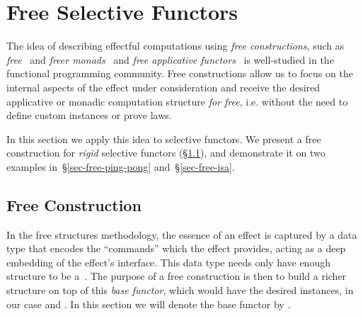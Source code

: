 \section{Free Selective Functors}\label{sec-free}

The idea of describing effectful computations using \emph{free constructions},
such as \emph{free}~\cite{swierstra2008data} and \emph{freer
monads}~\cite{kiselyov2015freer} and \emph{free applicative
functors}~\cite{free-applicatives} is well-studied in the functional programming
community. Free constructions allow us to focus on the internal aspects of the
effect under consideration and receive the desired applicative or monadic
computation structure \emph{for free}, i.e. without the need to define custom
instances or prove laws.

In this section we apply this idea to selective functors. We present a free
construction for \emph{rigid} selective functors
(\S\ref{sec-free-construction}), and demonstrate it on two examples
in~\S\ref{sec-free-ping-pong} and~\S\ref{sec-free-isa}.

\subsection{Free Construction}\label{sec-free-construction}

In the free structures methodology, the essence of an effect is captured by a
data type that encodes the ``commands'' which the effect provides, acting as a
deep embedding of the effect's interface. This data type needs only have enough
structure to be a~. The purpose of a free construction is then to
build a richer structure on top of this \emph{base functor}, which would have
the desired instances, in our case  and . In this
section we will denote the base functor by .

